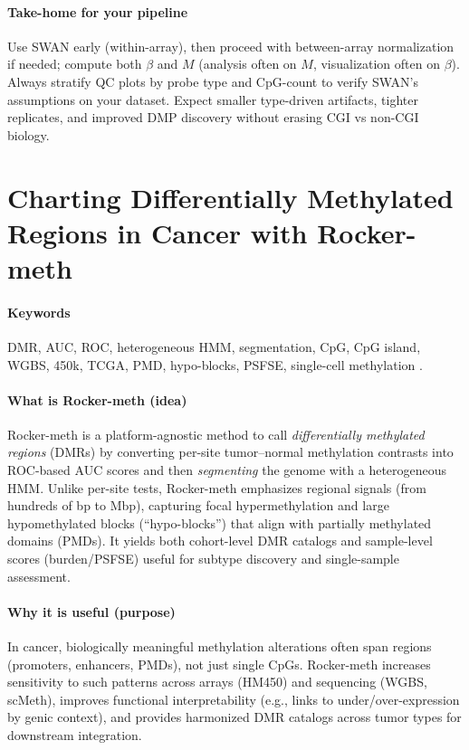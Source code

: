 \documentclass[10pt]{extarticle}
\begin{document}
\paragraph{Take-home for your pipeline}
Use SWAN early (within-array), then proceed with between-array normalization if needed; compute both $\beta$ and $M$ (analysis often on $M$, visualization often on $\beta$). Always stratify QC plots by probe type and CpG-count to verify SWAN’s assumptions on your dataset. Expect smaller type-driven artifacts, tighter replicates, and improved DMP discovery without erasing CGI vs non-CGI biology.

\section{Charting Differentially Methylated Regions in Cancer with Rocker-meth}

\paragraph{Keywords}
DMR, AUC, ROC, heterogeneous HMM, segmentation, CpG, CpG island, WGBS, 450k, TCGA, PMD, hypo-blocks, PSFSE, single-cell methylation \cite{benelli2021rockermeth}.

\paragraph{What is Rocker-meth (idea)}
Rocker-meth is a platform-agnostic method to call \emph{differentially methylated regions} (DMRs) by converting per-site tumor–normal methylation contrasts into ROC-based AUC scores and then \emph{segmenting} the genome with a heterogeneous HMM. Unlike per-site tests, Rocker-meth emphasizes regional signals (from hundreds of bp to Mbp), capturing focal hypermethylation and large hypomethylated blocks (``hypo-blocks'') that align with partially methylated domains (PMDs). It yields both cohort-level DMR catalogs and sample-level scores (burden/PSFSE) useful for subtype discovery and single-sample assessment. 

\paragraph{Why it is useful (purpose)}
In cancer, biologically meaningful methylation alterations often span regions (promoters, enhancers, PMDs), not just single CpGs. Rocker-meth increases sensitivity to such patterns across arrays (HM450) and sequencing (WGBS, scMeth), improves functional interpretability (e.g., links to under/over-expression by genic context), and provides harmonized DMR catalogs across tumor types for downstream integration.
\end{document}
